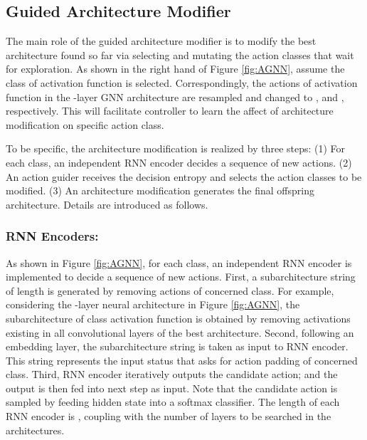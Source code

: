 \documentclass[sigconf]{acmart}
\begin{document}
\subsection{Guided Architecture Modifier}




The main role of the guided architecture modifier is to modify the best architecture found so far via selecting and mutating the action classes that wait for exploration. As shown in the right hand of Figure \ref{fig:AGNN}, assume the class of activation function is selected. Correspondingly, the actions of activation function in the -layer GNN architecture are resampled and changed to ,  and , respectively. 
This will facilitate controller to learn the affect of architecture modification on specific action class. 


To be specific, the architecture modification is realized by three steps: (1) For each class, an independent RNN encoder decides a sequence of new actions. (2) An action guider receives the decision entropy and selects the action classes to be modified. (3) An architecture modification generates the final offspring architecture. Details are introduced as follows.







\subsubsection{\textbf{RNN Encoders}:} As shown in Figure \ref{fig:AGNN}, for each class, an independent RNN encoder is implemented to decide a sequence of new actions. First, a subarchitecture string of length  is generated by removing  actions of concerned class. For example, considering the -layer neural architecture in Figure \ref{fig:AGNN}, the subarchitecture of class activation function is obtained by removing activations existing in all  convolutional layers of the best architecture. Second, following an embedding layer, the subarchitecture string is taken as input to RNN encoder. This string represents the input status that asks for action padding of concerned class. Third, RNN encoder iteratively outputs the candidate action; and the output is then fed into next step as input. Note that the candidate action is sampled by feeding hidden state  into a softmax classifier. The length of each RNN encoder is , coupling with the number of layers to be searched in the architectures.
\end{document}
